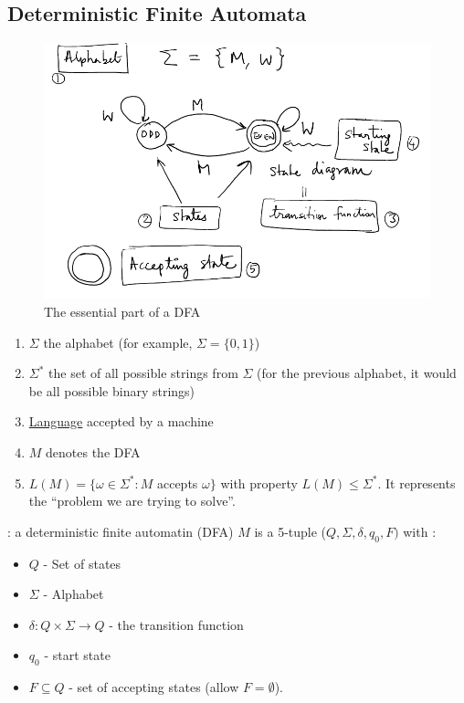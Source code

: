 \documentclass[12pt,a4paper]{article}
\newcommand{\<}{\langle}
\renewcommand{\>}{\rangle}
\begin{document}
\subsection{Deterministic Finite Automata}
\begin{figure}
	\centering
	\includegraphics[scale=0.5]{images/DFA}
	\caption{The essential part of a DFA}
	\label{fig: dfa}
\end{figure}
\begin{boite}
	\begin{enumerate}
		\item 	$\Sigma$ the alphabet (for example, $\Sigma = \{0,1\}$)
		\item 	$\Sigma^*$ the set of all possible strings from $\Sigma$ (for the previous alphabet, it would be all possible binary strings)
		\item 	\uline{Language} accepted by a machine
		\item 	$M$ denotes the DFA
		\item 	$L(M) = \{ \omega \in \Sigma^* : M$ accepts $\omega\}$ with property $L(M) \leq \Sigma^*$. It represents the ``problem we are trying to solve''.
	\end{enumerate}
\end{boite}
\begin{blackbox}

	 : a deterministic finite automatin (DFA) $M$ is a 5-tuple ($Q, \Sigma, \delta, q_0, F)$ with :
	\begin{itemize}
		\item 	$Q$ - Set of states
		\item 	$\Sigma$ - Alphabet
		\item 	$\delta : Q \times \Sigma \to Q$ - the transition function
		\item 	$q_0$ - start state
		\item 	$F \subseteq Q$ - set of accepting states (allow $F = \emptyset$).
	\end{itemize}
\end{blackbox}
\end{document}
